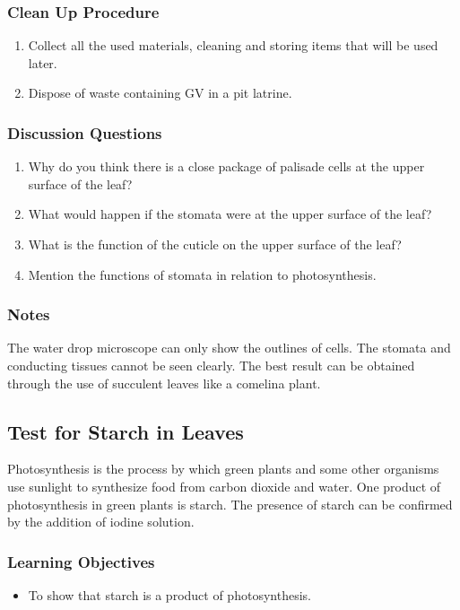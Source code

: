 \subsubsection*{Clean Up Procedure}
\begin{enumerate}
\item{Collect all the used materials, cleaning and storing items that will be used later.}
\item{Dispose of waste containing GV in a pit latrine.}
\end{enumerate}

\subsubsection*{Discussion Questions}
\begin{enumerate}
\item{Why do you think there is a close package of palisade cells at the upper surface of the leaf?}
\item{What would happen if the stomata were at the upper surface of the leaf?}
\item{What is the function of the cuticle on the upper surface of the leaf?}
\item{Mention the functions of stomata in relation to photosynthesis.}
\end{enumerate}

\subsubsection*{Notes}
The water drop microscope can only show the outlines of cells. The stomata and conducting tissues cannot be seen clearly. The best result can be obtained through the use of succulent leaves like a comelina plant.

\subsection{Test for Starch in Leaves}
Photosynthesis is the process by which green plants and some other organisms use sunlight to synthesize food from carbon dioxide and water. One product of photosynthesis in green plants is starch. The presence of starch can be confirmed by the addition of iodine solution.

\subsubsection*{Learning Objectives}
\begin{itemize}
\item{To show that starch is a product of photosynthesis.}
\end{itemize}

